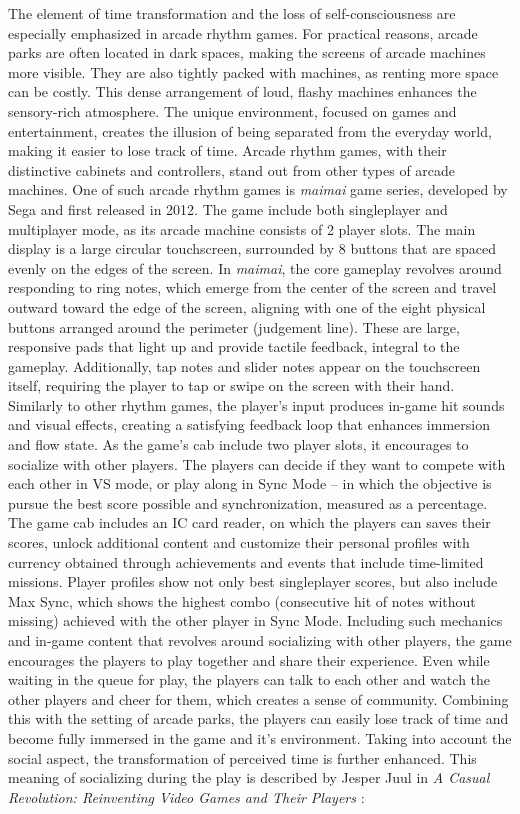 The element of time transformation and the loss of self-consciousness are especially emphasized in arcade rhythm games. For practical reasons, arcade parks are often located in dark spaces, making the screens of arcade machines more visible. They are also tightly packed with machines, as renting more space can be costly. This dense arrangement of loud, flashy machines enhances the sensory-rich atmosphere. The unique environment, focused on games and entertainment, creates the illusion of being separated from the everyday world, making it easier to lose track of time. Arcade rhythm games, with their distinctive cabinets and controllers, stand out from other types of arcade machines. One of such arcade rhythm games is \textit{maimai} game series, developed by Sega and first released in 2012. The game include both singleplayer and multiplayer mode, as its arcade machine consists of 2 player slots. The main display is a large circular touchscreen, surrounded by 8 buttons that are spaced evenly on the edges of the screen. In \textit{maimai}, the core gameplay revolves around responding to ring notes, which emerge from the center of the screen and travel outward toward the edge of the screen, aligning with one of the eight physical buttons arranged around the perimeter (judgement line). These are large, responsive pads that light up and provide tactile feedback, integral to the gameplay. Additionally, tap notes and slider notes appear on the touchscreen itself, requiring the player to tap or swipe on the screen with their hand. Similarly to other rhythm games, the player’s input produces in-game hit sounds and visual effects, creating a satisfying feedback loop that enhances immersion and flow state. As the game’s cab include two player slots, it encourages to socialize with other players. The players can decide if they want to compete with each other in VS mode, or play along in Sync Mode -- in which the objective is pursue the best score possible and synchronization, measured as a percentage. The game cab includes an IC card reader, on which the players can saves their scores, unlock additional content and customize their personal profiles with currency obtained through achievements and events that include time-limited missions. Player profiles show not only best singleplayer scores, but also include Max Sync, which shows the highest combo (consecutive hit of notes without missing) achieved with the other player in Sync Mode. Including such mechanics and in-game content that revolves around socializing with other players, the game encourages the players to play together and share their experience. Even while waiting in the queue for play, the players can talk to each other and watch the other players and cheer for them, which creates a sense of community. Combining this with the setting of arcade parks, the players can easily lose track of time and become fully immersed in the game and it’s environment. Taking into account the social aspect, the transformation of perceived time is further enhanced. This meaning of socializing during the play is described by Jesper Juul in \textit{A Casual Revolution: Reinventing Video Games and Their Players} \cite{casualrevolution}:

